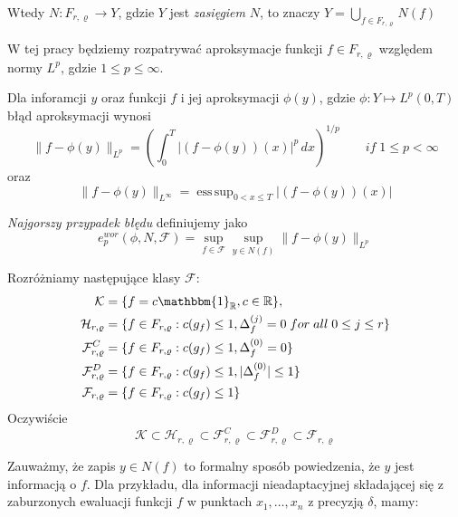 \documentclass[oik, pdftex, robocza, man]{mgrwms}
\DeclareMathOperator*{\esssup}{ess\,sup}
\begin{document}
\noindent
Wtedy $N\!: F_{r, \varrho} \longrightarrow Y$, gdzie $Y$ jest \textit{zasięgiem} $N$, to znaczy $\displaystyle Y = \bigcup_{f \in F_{r, \varrho}} N(f)$

W tej pracy będziemy rozpatrywać aproksymacje funkcji $f \in F_{r, \varrho}$ względem normy $L^p$, gdzie $1 \leq p \leq \infty$.

Dla inforamcji $y$ oraz funkcji $f$ i jej aproksymacji $\phi(y)$, gdzie $\phi : Y \longmapsto L^p(0, T)$ błąd aproksymacji wynosi
\begin{equation*}
    \|f-\phi(y)\|_{L^p} = \left( \int_{0}^{T} |(f-\phi(y))(x)|^p \,dx  \right)^{1/p} \qquad if \; 1 \leq p < \infty
\end{equation*}
oraz
\begin{equation*}
    \|f-\phi(y)\|_{L^\infty} = \esssup_{0 < x \leq T} | (f - \phi(y))(x) |
\end{equation*}

\textit{Najgorszy przypadek błędu} definiujemy jako
\begin{equation*}
    e^{wor}_{p}(\phi, N, \mathcal{F}) = \sup_{f \in \mathcal{F}} \sup_{y \in N(f)} \|f - \phi(y) \|_{L^p}
\end{equation*}

Rozróżniamy następujące klasy $\mathcal{F}$:
\begin{equation*}
    \begin{split}
        \mathcal{K} & = \{f = c \mathbbm{1}_{\R}, c \in \R \}, \\
        \mathcal{H}_{r, \varrho} & = \{ f \in F_{r, \varrho}: c(g_{f}) \leq 1, \Delta_{f}^{(j)} = 0 \; for\; all\; 0 \leq j \leq r\} \\
        \mathcal{F}_{r, \varrho}^{C} & = \{ f \in F_{r, \varrho}: c(g_{f}) \leq 1, \Delta_{f}^{(0)} = 0 \} \\
        \mathcal{F}_{r, \varrho}^{D} & = \{ f \in F_{r, \varrho}: c(g_{f}) \leq 1, | \Delta_{f}^{(0)} | \leq 1 \} \\
        \mathcal{F}_{r, \varrho} & = \{ f \in F_{r, \varrho}: c(g_{f}) \leq 1 \} \\
    \end{split}
\end{equation*}
Oczywiście
\begin{equation*}
    \mathcal{K} \subset \mathcal{H}_{r, \varrho} \subset \mathcal{F}_{r, \varrho}^{C} \subset \mathcal{F}_{r, \varrho}^{D} \subset \mathcal{F}_{r, \varrho}
\end{equation*}

Zauważmy, że zapis $y \in N(f)$ to formalny sposób powiedzenia, że $y$ jest informacją o $f$. Dla przykładu, dla informacji nieadaptacyjnej składającej się z zaburzonych ewaluacji funkcji $f$ w punktach $x_{1}, \dots, x_{n}$ z precyzją $\delta$, mamy:
\end{document}
